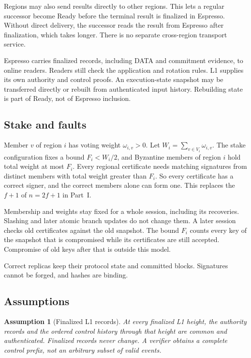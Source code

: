 \documentclass[11pt,a4paper]{article}
\newtheorem{assumption}[assumption]{Assumption}
\newcounter{protocol}
\begin{document}
Regions may also send results directly to other regions. This lets a
regular successor become Ready before the terminal result is finalized
in Espresso. Without direct delivery, the successor reads the result
from Espresso after finalization, which takes longer. There is no
separate cross-region transport service.

Espresso carries finalized records, including DATA and commitment
evidence, to online readers. Readers still check the application and
rotation rules. L1 supplies its own authority and control proofs. An
execution-state snapshot may be transferred directly or rebuilt from
authenticated input history. Rebuilding state is part of Ready,
not of Espresso inclusion.

\subsection{Stake and faults}
\label{sec:stake}
Member $v$ of region $i$ has voting weight $\omega_{i,v}>0$. Let
$W_i=\sum_{v\in V_i}\omega_{i,v}$. The stake configuration fixes a bound
$F_i<W_i/2$, and Byzantine members of region $i$ hold total weight at
most $F_i$. Every regional certificate needs matching signatures from
distinct members with total weight greater than $F_i$. So every
certificate has a correct signer, and the correct members alone can form
one. This replaces the $f+1$ of $n=2f+1$ in Part~I.

Membership and weights stay fixed for a whole session, including its
recoveries. Slashing and later atomic branch updates do not change them. A later
session checks old certificates against the old snapshot. The bound
$F_i$ counts every key of the snapshot that is compromised while its
certificates are still accepted. Compromise of old keys after that is
outside this model.

Correct replicas keep their protocol state and committed blocks.
Signatures cannot be forged, and hashes are binding.

\subsection{Assumptions}
\label{sec:assumptions}
\begin{assumption}[Finalized L1 records]
\label{ass:authority}
At every finalized L1 height, the authority records and the ordered
control history through that height are common and authenticated.
Finalized records never change. A verifier obtains a complete control
prefix, not an arbitrary subset of valid events.
\end{assumption}
\end{document}
